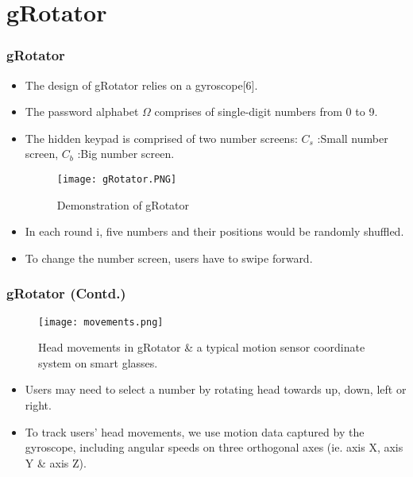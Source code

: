 \documentclass{beamer}
\begin{document}
\section{gRotator}
\begin{frame}
\frametitle{gRotator}
\begin{itemize}

\justifying

    \item The design of gRotator relies on a gyroscope[6].
    \item The password alphabet $\Omega$ comprises of single-digit numbers from 0 to 9.
    
    \item The hidden keypad  is comprised of two number
screens:\newline
$C_s$ :Small number screen, $C_b$ :Big number screen.
    
 \begin{figure}
    \begin{center}
        \texttt{[image: gRotator.PNG]}
        \caption{Demonstration of gRotator}
    \end{center}
\end{figure}
    \item In each round i, five numbers and their positions
would be randomly shuffled.
    \item To change the number screen, users have to swipe
forward.
    
\end{itemize}
\end{frame}


\begin{frame}
\frametitle{gRotator (Contd.)}

\begin{figure}
    \begin{center}
        \texttt{[image: movements.png]}
        \caption{Head movements in gRotator \& a typical motion sensor coordinate system on smart glasses.}
    \end{center}
\end{figure}


\justifying

\begin{itemize}

    \item Users may need to select a number by rotating head towards up, down, left or right.
   \item To track users’ head movements,
we use motion data captured by the gyroscope, including angular speeds on three orthogonal axes (ie. axis X, axis Y \& axis Z).
\end{itemize}

\end{frame}
\end{document}
